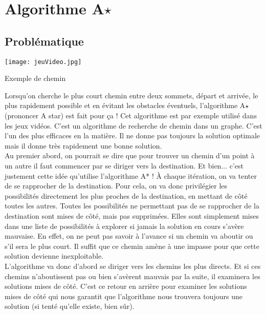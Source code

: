 \chapter{Algorithme A$\star$} 
 
 
\section{Problématique}


\begin{marginfigure}
\texttt{[image: jeuVideo.jpg]}
\caption{Exemple de chemin}
\end{marginfigure}


Lorsqu'on cherche le plus court chemin entre deux sommets, départ et arrivée, le plus rapidement possible et en évitant les obstacles éventuels, l'algorithme A$\star$ (prononcer A star) est fait pour ça ! Cet algorithme est par exemple utilisé dans les jeux vidéos.
C'est un algorithme de recherche de chemin dans un graphe. C'est l'un des plus efficaces en la matière. Il ne donne pas toujours la solution optimale mais il donne très rapidement une bonne solution.\\


Au premier abord, on pourrait se dire que pour trouver un chemin d'un point à un autre il faut commencer par se diriger vers la destination. Et bien... c'est justement cette idée qu'utilise l'algorithme A* ! À chaque itération, on va tenter de se rapprocher de la destination. Pour cela, on va donc privilégier les possibilités directement les plus proches de la destination, en mettant de côté toutes les autres. Toutes les possibilités ne permettant pas de se rapprocher de la destination sont mises de côté, mais pas supprimées. Elles
sont simplement mises dans une liste de possibilités à explorer si jamais la solution en cours s'avère mauvaise.
En effet, on ne peut pas savoir à l'avance si un chemin va aboutir ou s'il sera le plus court. Il suffit que ce chemin amène à une impasse pour que cette solution devienne inexploitable.\\
L'algorithme va donc d'abord se diriger vers les chemins les plus directs. Et si ces chemins n'aboutissent pas ou bien s'avèrent mauvais par la suite, il examinera les solutions mises de côté. C'est ce retour en arrière pour examiner les solutions mises de côté qui nous garantit que l'algorithme nous trouvera toujours une solution (si
tenté qu'elle existe, bien sûr).




